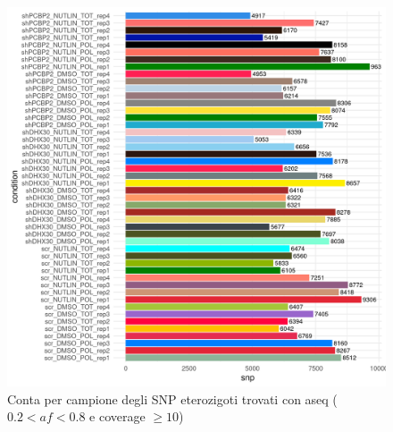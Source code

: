  \begin{figure}%
   \centering
   \includegraphics[scale=1]{aseq_count_2_8_10_pre.png}
	 \caption{Conta per campione degli SNP eterozigoti trovati con aseq ($0.2< af < 0.8$ e coverage $\ge 10$)}
   \label{fig:aseqcount}
 \end{figure}


